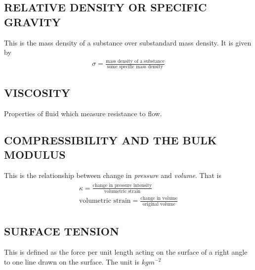 \documentclass[11pt]{report}
\newcommand{\sps}{\\[0.2cm]}
\newcommand{\tti}[1]{\textit{#1}}
\begin{document}
	\subsection{RELATIVE DENSITY OR SPECIFIC GRAVITY}
	This is the mass density of a substance over substandard mass density. It is given by
	\begin{eqnarray*}
		\sigma = \frac{\text{mass density of a substance}}{\text{some specific mass density}}
	\end{eqnarray*}
	
	\subsection{VISCOSITY}
	Properties of fluid which measure resistance to flow.
	
	\subsection{COMPRESSIBILITY AND THE BULK MODULUS}
	This is the relationship between change in \tti{pressure} and \tti{volume}. That is
	\begin{eqnarray*}
		\begin{array}{l}
			\kappa = \frac{\text{change in pressure intensity}}{\text{volumetric strain}}\sps
			\text{volumetric strain} = \frac{\text{change in volume}}{\text{original volume}}
		\end{array}
	\end{eqnarray*}
	
	\subsection{SURFACE TENSION}
	This is defined as the force per unit length acting on the surface of a right angle to one line drawn on the surface. The unit is $kgm^{-2}$
	
\end{document}
